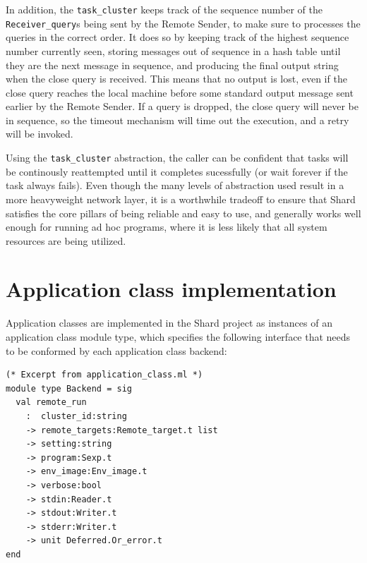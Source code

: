 \documentclass[twoside]{report}
\begin{document}
In addition, the \texttt{task\_cluster} keeps track of the sequence number of the \texttt{Receiver\_query}s being sent by the Remote Sender, to make sure to processes the queries in the correct order.
It does so by keeping track of the highest sequence number currently seen, storing messages out of sequence in a hash table until they are the next message in sequence, and producing the final output string when the close query is received.
This means that no output is lost, even if the close query reaches the local machine before some standard output message sent earlier by the Remote Sender.
If a query is dropped, the close query will never be in sequence, so the timeout mechanism will time out the execution, and a retry will be invoked.

Using the \texttt{task\_cluster} abstraction, the caller can be confident that tasks will be continously reattempted until it completes sucessfully (or wait forever if the task always fails).
Even though the many levels of abstraction used result in a more heavyweight network layer, it is a worthwhile tradeoff to ensure that Shard satisfies the core pillars of being reliable and easy to use, and generally works well enough for running ad hoc programs, where it is less likely that all system resources are being utilized.

\section{Application class implementation}


Application classes are implemented in the Shard project as instances of an application class module type, which specifies the following interface that needs to be conformed by each application class backend:

\begin{minipage}[c]{\textwidth-15pt}
  \begin{lstlisting}
(* Excerpt from application_class.ml *)
module type Backend = sig
  val remote_run
    :  cluster_id:string
    -> remote_targets:Remote_target.t list
    -> setting:string
    -> program:Sexp.t
    -> env_image:Env_image.t
    -> verbose:bool
    -> stdin:Reader.t
    -> stdout:Writer.t
    -> stderr:Writer.t
    -> unit Deferred.Or_error.t
end
\end{lstlisting}
  \smallskip
\end{minipage}
\end{document}
